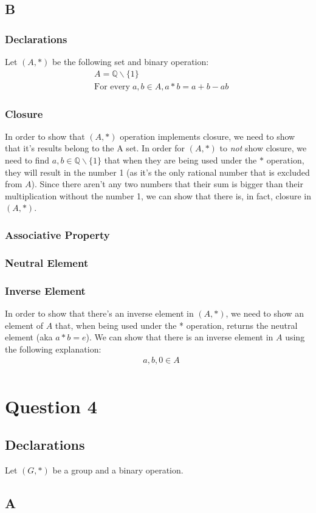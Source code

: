 \documentclass[12pt, oneside]{article}
\begin{document}
\subsection{B}
\setcounter{subsubsection}{-1}
\subsubsection{Declarations}
Let $(A, *)$ be the following set and binary operation:
\begin{eqnarray*}
& A = \mathbb{Q}\backslash\{1\}\\
& \text{For every}\;a, b \in A, a * b = a + b - ab
\end{eqnarray*}

\subsubsection{Closure}
In order to show that $(A, *)$ operation implements closure, we need to show that it’s results belong to the A set. In order for $(A, *)$ to \emph{not} show closure, we need to find $a, b \in \mathbb{Q}\backslash\{1\}$ that when they are being used under the $*$ operation, they will result in the number 1 (as it's the only rational number that is excluded from $A$). Since there aren't any two numbers that their sum is bigger than their multiplication without the number 1, we can show that there is, in fact, closure in $(A, *)$.

\subsubsection{Associative Property}

\subsubsection{Neutral Element}

\subsubsection{Inverse Element}
In order to show that there's an inverse element in $(A, *)$, we need to show an element of $A$ that, when being used under the * operation, returns the neutral element (aka $a * b = e$). We can show that there is an inverse element in $A$ using the following explanation:
\begin{eqnarray*}
& a, b, 0 \in A\\
\end{eqnarray*}

\section{Question 4}
\setcounter{subsection}{-1}
\subsection{Declarations}
Let $(G, *)$ be a group and a binary operation.

\subsection{A}
\end{document}
